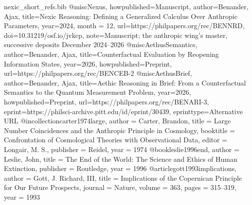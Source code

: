 \begin{filecontents}[overwrite]{nexic_short_refs.bib}
@misc{Nexus, howpublished={Manuscript}, author={Benander, Ajax}, title={Nexic Reasoning: Defining a Generalized Calculus Over Anthropic Parameters}, year={2024}, month = {12}, url={https://philpapers.org/rec/BENNRD}, doi={10.31219/osf.io/jvkcp}, note={Manuscript; the anthropic wing's master, successive deposits December 2024--2026}}
@misc{AethusSemantics, author={Benander, Ajax}, title={Counterfactual Evaluation by Reopening Information States}, year={2026}, howpublished={Preprint}, url={https://philpapers.org/rec/BENCEB-2}}
@misc{AethusBrief, author={Benander, Ajax}, title={Aethic Reasoning in Brief: From a Counterfactual Semantics to the Quantum Measurement Problem}, year={2026}, howpublished={Preprint}, url={https://philpapers.org/rec/BENARI-3}, eprint={https://philsci-archive.pitt.edu/id/eprint/30439}, eprinttype={Alternative URL}}
@incollection{carter1974large,
  author = {Carter, Brandon},
  title = {Large Number Coincidences and the Anthropic Principle in Cosmology},
  booktitle = {Confrontation of Cosmological Theories with Observational Data},
  editor = {Longair, M. S.},
  publisher = {Reidel},
  year = {1974}
}
@book{leslie1996end,
  author = {Leslie, John},
  title = {The End of the World: The Science and Ethics of Human Extinction},
  publisher = {Routledge},
  year = {1996}
}
@article{gott1993implications,
  author = {Gott, J. Richard, III},
  title = {Implications of the Copernican Principle for Our Future Prospects},
  journal = {Nature},
  volume = {363},
  pages = {315--319},
  year = {1993}
}

\end{filecontents}
